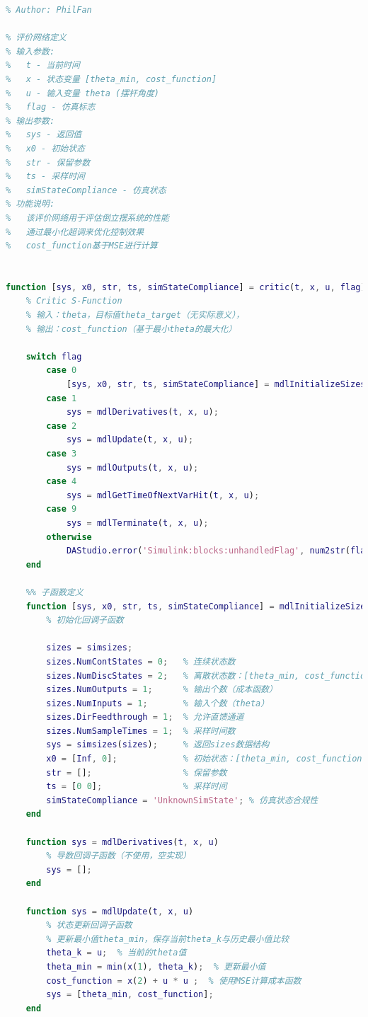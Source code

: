 \documentclass[12pt,a4paper,UTF8]{article}
\begin{document}
\begin{lstlisting}[language=Matlab]
% Date: 2024-12-03
% Author: PhilFan 

% 评价网络定义
% 输入参数:
%   t - 当前时间
%   x - 状态变量 [theta_min, cost_function]
%   u - 输入变量 theta (摆杆角度)
%   flag - 仿真标志
% 输出参数:
%   sys - 返回值
%   x0 - 初始状态
%   str - 保留参数
%   ts - 采样时间
%   simStateCompliance - 仿真状态
% 功能说明:
%   该评价网络用于评估倒立摆系统的性能
%   通过最小化超调来优化控制效果
%   cost_function基于MSE进行计算


function [sys, x0, str, ts, simStateCompliance] = critic(t, x, u, flag)
    % Critic S-Function
    % 输入：theta，目标值theta_target（无实际意义），
    % 输出：cost_function（基于最小theta的最大化）

    switch flag
        case 0
            [sys, x0, str, ts, simStateCompliance] = mdlInitializeSizes();
        case 1
            sys = mdlDerivatives(t, x, u);
        case 2
            sys = mdlUpdate(t, x, u);
        case 3
            sys = mdlOutputs(t, x, u);
        case 4
            sys = mdlGetTimeOfNextVarHit(t, x, u);
        case 9
            sys = mdlTerminate(t, x, u);
        otherwise
            DAStudio.error('Simulink:blocks:unhandledFlag', num2str(flag));
    end

    %% 子函数定义
    function [sys, x0, str, ts, simStateCompliance] = mdlInitializeSizes()
        % 初始化回调子函数
        
        sizes = simsizes;
        sizes.NumContStates = 0;   % 连续状态数
        sizes.NumDiscStates = 2;   % 离散状态数：[theta_min, cost_function]
        sizes.NumOutputs = 1;      % 输出个数（成本函数）
        sizes.NumInputs = 1;       % 输入个数（theta）
        sizes.DirFeedthrough = 1;  % 允许直馈通道
        sizes.NumSampleTimes = 1;  % 采样时间数
        sys = simsizes(sizes);     % 返回sizes数据结构
        x0 = [Inf, 0];             % 初始状态：[theta_min, cost_function]
        str = [];                  % 保留参数
        ts = [0 0];                % 采样时间
        simStateCompliance = 'UnknownSimState'; % 仿真状态合规性
    end

    function sys = mdlDerivatives(t, x, u)
        % 导数回调子函数（不使用，空实现）
        sys = [];
    end

    function sys = mdlUpdate(t, x, u)
        % 状态更新回调子函数
        % 更新最小值theta_min，保存当前theta_k与历史最小值比较
        theta_k = u;  % 当前的theta值
        theta_min = min(x(1), theta_k);  % 更新最小值
        cost_function = x(2) + u * u ;  % 使用MSE计算成本函数
        sys = [theta_min, cost_function];
    end


\end{lstlisting}
\end{document}
